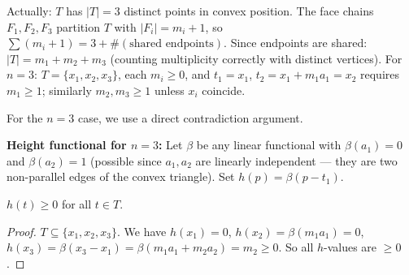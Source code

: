 Actually: $T$ has $|T|=3$ distinct points in convex position. The face chains $F_1, F_2, F_3$ partition $T$ with $|F_i| = m_i + 1$, so $\sum (m_i+1) = 3 + \#(\text{shared endpoints})$. Since endpoints are shared: $|T| = m_1 + m_2 + m_3$ (counting multiplicity correctly with distinct vertices). For $n=3$: $T = \{x_1,x_2,x_3\}$, each $m_i \geq 0$, and $t_1 = x_1$, $t_2 = x_1 + m_1 a_1 = x_2$ requires $m_1 \geq 1$; similarly $m_2, m_3 \geq 1$ unless $x_i$ coincide.

For the $n=3$ case, we use a direct contradiction argument.

\bigskip

\textbf{Height functional for $n=3$:} Let $\beta$ be any linear functional with $\beta(a_1) = 0$ and $\beta(a_2) = 1$ (possible since $a_1, a_2$ are linearly independent — they are two non-parallel edges of the convex triangle). Set $h(p) = \beta(p - t_1)$.

\begin{lemma}[betamin3]\label{lem:betamin3}
$h(t) \geq 0$ for all $t \in T$.
\end{lemma}
\begin{proof}
$T \subseteq \{x_1,x_2,x_3\}$. We have $h(x_1)=0$, $h(x_2) = \beta(m_1 a_1) = 0$, $h(x_3) = \beta(x_3 - x_1) = \beta(m_1 a_1 + m_2 a_2) = m_2 \geq 0$. So all $h$-values are $\geq 0$.
\end{proof}

